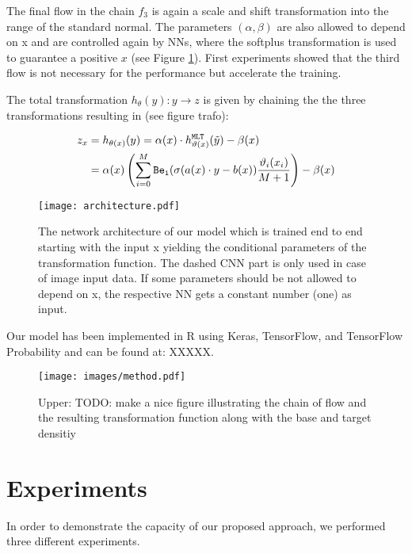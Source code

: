 \documentclass[a4paper,conference]{IEEEtran}
\begin{document}
The final flow in the chain $f_3$ is again a scale and shift transformation into the range of the standard normal. The parameters $(\alpha, \beta)$ are also allowed to depend on x and are controlled again by NNs, where the softplus transformation is used to guarantee a positive $x$ (see Figure \ref{fig:NN}). First experiments showed that the third flow is not necessary for the performance but accelerate the training. 

The total transformation $ h_\theta(y): y \rightarrow z $ is given by chaining the the three transformations resulting in (see figure trafo):

\begin{equation}
\begin{split}
    z_x &= h_{\theta(x)}(y) = \alpha(x) \cdot h_{\vartheta(x)}^{\tt MLT}(\tilde y) - \beta(x) \\\
    &= \alpha(x) \left( \sum_{i=0}^M {\tt Be_i}(\sigma(a(x) \cdot y - b(x)) \frac{\vartheta_i(x_i)}{M+1} \right) - \beta(x)
\end{split}
\end{equation}

\begin{figure}
\centering
\texttt{[image: architecture.pdf]}
\caption{The network architecture of our model which is trained end to end starting with the input x yielding the conditional parameters of the transformation function. The dashed CNN part is only used in case of image input data. If some parameters should be not allowed to depend on x, the respective NN gets a constant number (one) as input. }
\label{fig:NN}
\end{figure}

Our model has been implemented in R using Keras, TensorFlow, and TensorFlow Probability and can be found at: XXXXX.


\begin{figure}
\centering
\texttt{[image: images/method.pdf]}
\caption{Upper: TODO: make a nice figure illustrating the chain of flow and the resulting transformation function along with the base and target densitiy}
\label{fig:fig_trafo}
\end{figure}

\section{Experiments}
In order to demonstrate the capacity of our proposed approach, we performed three different experiments.
\end{document}
